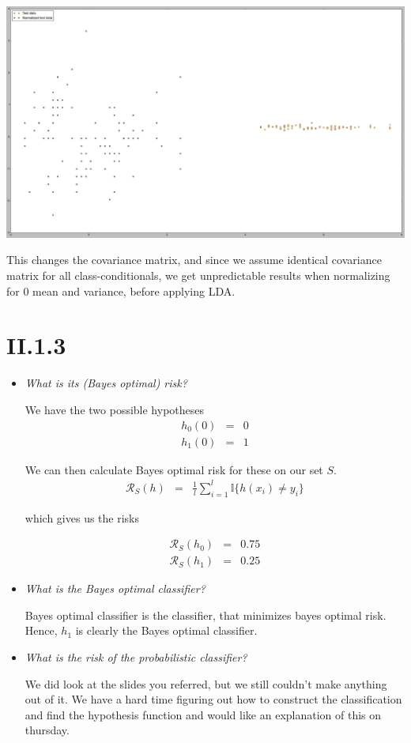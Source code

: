 \documentclass[12pt, a4paper]{article}
\begin{document}
\includegraphics[scale=0.25]{lda_normalized_side.png}

This changes the covariance matrix, and since we assume identical covariance matrix for all class-conditionals, we get unpredictable results when normalizing for 0 mean and variance, before applying LDA.

\section{II.1.3}
\begin{itemize}
\item \textit{What is its (Bayes optimal) risk?}

We have the two possible hypotheses
\begin{eqnarray}
	h_0(0) &=& 0 \\
	h_1(0) &=& 1
\end{eqnarray}

We can then calculate Bayes optimal risk for these on our set $S$.
\begin{eqnarray}
	\mathcal{R}_S(h) &=& \frac{1}{l}\sum^l_{i=1} \mathbb{I}\{h(x_i) \neq y_i\}
\end{eqnarray}

which gives us the risks

\begin{eqnarray}
	\mathcal{R}_S(h_0) &=& 0.75 \\
	\mathcal{R}_S(h_1) &=& 0.25
\end{eqnarray}

\item \textit{What is the Bayes optimal classifier?}

Bayes optimal classifier is the classifier, that minimizes bayes optimal risk. Hence, \underline{$h_1$} is clearly the Bayes optimal classifier.

\item \textit{What is the risk of the probabilistic classifier?}

We did look at the slides you referred, but we still couldn't make anything out of it. We have a hard time figuring out how to construct the classification and find the hypothesis function and would like an explanation of this on thursday.

\end{itemize}
\end{document}
